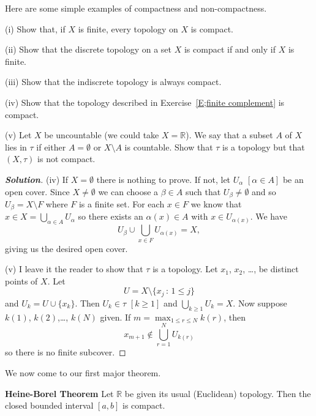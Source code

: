 Here are some simple examples of compactness and non-compactness.

\begin{theorem}\label{T;simple compact examples}
(i) Show that, if $X$ is finite, every
topology on $X$ is compact.

(ii) Show that the discrete topology on a set $X$ is
compact if and only if $X$ is finite.

(iii) Show that the indiscrete topology is always compact.

(iv) Show that the topology described in 
Exercise~\ref{E;finite complement} is compact.

(v) Let $X$ be uncountable (we could take
$X={\mathbb R}$).
We say that a subset $A$ of $X$ lies in $\tau$ if
either $A=\emptyset$ or $X\setminus A$ is countable.
Show that $\tau$ is a topology
but that $(X,\tau)$
is not compact.
\end{theorem}

\begin{proof}[\bf Solution] 
(iv) If $X=\emptyset$ there is nothing to prove.
If not, let $U_{\alpha}$ $[\alpha\in A]$ be an open cover.
Since $X\neq\emptyset$ we can choose a $\beta\in A$
such that $U_{\beta}\neq\emptyset$ and so
$U_{\beta}=X\setminus F$ where $F$ is a finite set.
For each $x\in F$ we know that $x\in X=\bigcup_{\alpha\in A}U_{\alpha}$
so there exists an $\alpha(x)\in A$ with $x\in U_{\alpha(x)}$.
We have
\[U_{\beta}\cup\bigcup_{x\in F}U_{\alpha(x)}=X,\]
giving us the desired open cover.

(v) I leave it the reader to show that $\tau$ is a topology.
Let $x_{1}$, $x_{2}$, \dots, be distinct points of $X$.
Let 
\[U=X\setminus\{x_{j}\,:\,1\leq j\}\]
and $U_{k}=U\cup\{x_{k}\}$. Then $U_{k}\in\tau$ $[k\geq 1]$
and $\bigcup_{k\geq 1}U_{k}=X$. 
Now suppose $k(1)$, $k(2)$,\dots, $k(N)$ given.
If $m=\max_{1\leq r\leq N}k(r)$, then
\[x_{m+1}\notin\bigcup_{r=1}^{N}U_{k(r)}\]
so there is no finite subcover.
\end{proof}

We now come to our first major theorem.


\begin{theorem}\label{T;Heine-Borel}
{\bf Heine-Borel Theorem}
Let ${\mathbb R}$ be given its usual (Euclidean) topology. Then the closed bounded interval $[a,b]$ is compact.
\end{theorem}

